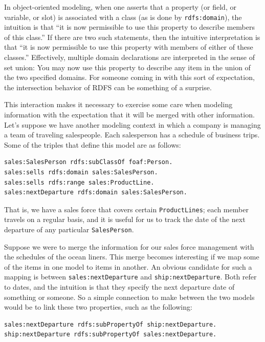 In object-oriented modeling, when one asserts that a property (or field,
or variable, or slot) is associated with a class (as is done by
\texttt{rdfs:domain}), the intuition is that ``it is now permissible to use this
property to describe members of this class.'' If there are two such
statements, then the intuitive interpretation is that ``it is now
permissible to use this property with members of either of these
classes.'' Effectively, multiple domain declarations are interpreted in
the sense of set union: You may now use this property to describe any
item in the union of the two specified domains. For someone coming in
with this sort of expectation, the intersection behavior of RDFS can be
something of a surprise.

This interaction makes it necessary to exercise some care when modeling
information with the expectation that it will be merged with other
information. Let's suppose we have another modeling context in which a
company is managing a team of traveling salespeople. Each salesperson
has a schedule of business trips. Some of the triples that define this
model are as follows:

\begin{lstlisting}
sales:SalesPerson rdfs:subClassOf foaf:Person.
sales:sells rdfs:domain sales:SalesPerson.
sales:sells rdfs:range sales:ProductLine.
sales:nextDeparture rdfs:domain sales:SalesPerson.
\end{lstlisting}

That is, we have a sales force that covers certain \texttt{ProductLines}; each
member travels on a regular basis, and it is useful for us to track the
date of the next departure of any particular \texttt{SalesPerson}.

Suppose we were to merge the information for our sales force management
with the schedules of
the ocean liners. This merge becomes interesting if we map some of the
items in one model to items
in another. An obvious candidate for such a mapping is between
\texttt{sales:nextDeparture} and \texttt{ship:nextDeparture}. Both refer to dates, and the
intuition is that they specify the next departure date of something or
someone. So a simple connection to make between the two models would be
to link these two properties, such as the following:

\begin{lstlisting}
sales:nextDeparture rdfs:subPropertyOf ship:nextDeparture.
ship:nextDeparture rdfs:subPropertyOf sales:nextDeparture.
\end{lstlisting}

